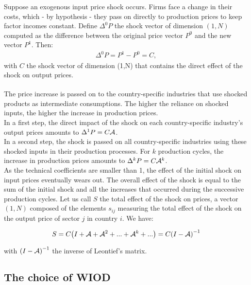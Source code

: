 \documentclass[11pt,a4paper]{article}
\begin{document}
Suppose an exogenous input price shock occurs. Firms face a change in their costs, which - by hypothesis - they pass on directly to production prices to keep factor incomes constant.
Define ${{\Delta }^{0}}P$ the shock vector of dimension $(1, N)$ computed as the difference between the original price vector $P^0$ and the new vector $P^1$. Then:
\begin{eqnarray*}
\Delta ^{0}P=P^1-P^0=C, 
\end{eqnarray*}
with $C$ the shock vector of dimension (1,N) that contains the direct effect of the shock on output prices.\\
\\
The price increase is passed on to the country-specific industries that use shocked products as intermediate consumptions. The higher the reliance on shocked inputs, the higher the increase in production prices.\\
In a first step, the direct impact of the shock on each country-specific industry's output prices amounts to $\Delta^{1}P=C{\cal A}$.\\
In a second step, the shock is passed on all country-specific industries using these shocked inputs in their production processes. For $k$ production cycles, the increase in production prices amounts to $\Delta^k P=C{\cal A}^k$.\\
As the technical coefficients are smaller than 1, the effect of the initial shock on input prices eventually wears out.
The overall effect of the shock is equal to the sum of the initial shock and all the increases that occurred during the successive production cycles.
Let us call $S$ the total effect of the shock on prices, a vector $(1, N)$ composed of the elements $s_{ij}$ measuring the total effect of the shock on the output price of sector $j$ in country $i$. We have: 

\begin{eqnarray}
S=C {\left( I+{\cal A}+{\cal A}^2+...+{\cal A}^k+...\right)} =C {\left( I-{\cal A} \right)}^{-1}
\label{eq:eqchocprix} 
\end{eqnarray}


with ${\left( I-{\cal A} \right)}^{-1}$ the inverse of Leontief's matrix.

\subsection{The choice of WIOD}
\label{subsec:data}
\end{document}
